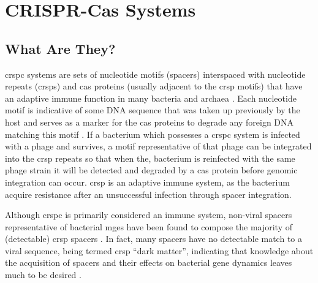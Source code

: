 \section*{CRISPR-Cas Systems}
\subsection*{What Are They?}
\ac{crspc} systems are sets of nucleotide motifs (spacers) interspaced with nucleotide repeats (\ac{crsp}s) and \ac{cas} proteins (usually adjacent to the \ac{crsp} motifs) that have an adaptive immune function in many bacteria and archaea \citep{crispgen}.
Each nucleotide motif is indicative of some DNA sequence that was taken up previously by the host and serves as a marker for the \ac{cas} proteins to degrade any foreign DNA matching this motif \citep{crispgen}.
If a bacterium which possesses a \ac{crspc} system is infected with a phage and survives, a motif representative of that phage can be integrated into the \ac{crsp} repeats so that when the, bacterium is reinfected with the same phage strain it will be detected and degraded by a \ac{cas} protein before genomic integration can occur.
\ac{crsp} is an adaptive immune system, as the bacterium acquire resistance after an unsuccessful infection through spacer integration.\par
Although \ac{crspc} is primarily considered an immune system, non-viral spacers representative of bacterial \ac{mge}s have been found to compose the majority of (detectable) \ac{crsp} spacers \citep{nonvspacer}.
In fact, many spacers have no detectable match to a viral sequence, being termed \ac{crsp} ``dark matter'', indicating that knowledge about the acquisition of spacers and their effects on bacterial gene dynamics leaves much to be desired \citep{nonvspacer}.
